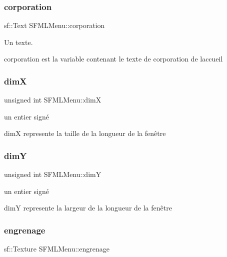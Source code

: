 \subsubsection{\texorpdfstring{corporation}{corporation}}
{\footnotesize\ttfamily sf\+::\+Text S\+F\+M\+L\+Menu\+::corporation\hspace{0.3cm}{\ttfamily [private]}}



Un texte. 

corporation est la variable contenant le texte de corporation de l\textquotesingle{}accueil \mbox{\label{class_s_f_m_l_menu_a5708eb1cae68873cd20b19eb8a38e75b}} 
\subsubsection{\texorpdfstring{dimX}{dimX}}
{\footnotesize\ttfamily unsigned int S\+F\+M\+L\+Menu\+::dimX\hspace{0.3cm}{\ttfamily [private]}}



un entier signé 

dimX represente la taille de la longueur de la fenêtre \mbox{\label{class_s_f_m_l_menu_a31f77dcaeee348f69734c9ed010ad759}} 
\subsubsection{\texorpdfstring{dimY}{dimY}}
{\footnotesize\ttfamily unsigned int S\+F\+M\+L\+Menu\+::dimY\hspace{0.3cm}{\ttfamily [private]}}



un entier signé 

dimY represente la largeur de la longueur de la fenêtre \mbox{\label{class_s_f_m_l_menu_a9df23c060560acd7dac332112752324a}} 
\subsubsection{\texorpdfstring{engrenage}{engrenage}}
{\footnotesize\ttfamily sf\+::\+Texture S\+F\+M\+L\+Menu\+::engrenage\hspace{0.3cm}{\ttfamily [private]}}



